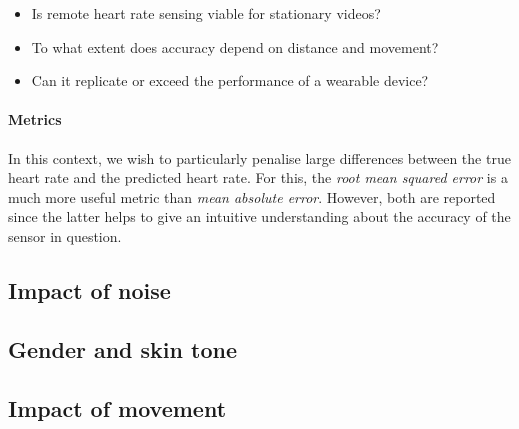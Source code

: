% 
\begin{itemize}
    \item Is remote heart rate sensing viable for stationary videos?
    \item To what extent does accuracy depend on distance and movement?
    \item Can it replicate or exceed the performance of a wearable device?
\end{itemize}

\paragraph{Metrics}
In this context, we wish to particularly penalise large differences between the true heart rate and the predicted heart rate. For this, 
the \textit{root mean squared error} is a much more useful metric than \textit{mean absolute error}. However, both are reported since the latter helps
to give an intuitive understanding about the accuracy of the sensor in question.


\subsection{Impact of noise}
\subsection{Gender and skin tone}

\subsection{Impact of movement}

